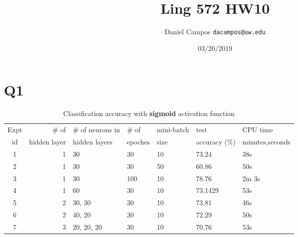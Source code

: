 \documentclass[11pt]{article}
\begin{document}
\title{Ling 572 HW10}
\author{Daniel Campos  \tt {dacampos@uw.edu}}
\date{03/20/2019}
\maketitle 
\section{Q1}         
\begin{table}[h]
\centering
\caption{Classification accuracy with {\bf sigmoid} activation function}
\label{table1}
  \begin{tabular}{|c|r|l|l|l|l|l|} \hline
    Expt & \# of          & \# of neurons in & \# of    & mini-batch & test  & CPU time   \\  
    id   &  hidden layer  & hidden layers    & epoches & size       & accuracy (\%) & minutes,seconds \\ \hline
    1   &  1              &  30              &  30     &  10       &  73.24   & 38s \\ \hline
    2   &  1              &  30              &  30     &  50       &  60.86   & 50s \\ \hline
    3   &  1              &  30              &  100    &  10       &  78.76   & 2m 3s  \\ \hline
    4   &  1              &  60              &  30     &  10       &  73.1429   & 53s \\ \hline
    5   &  2              &  30, 30          &  30     &  10       &  73.81  & 46s \\ \hline
    6   &  2              &  40, 20          &  30     &  10       &  72.29   & 50s\\ \hline
    7   &  3              &  20, 20, 20      &  30     &  10       &  70.76  & 53s \\ \hline
  \end{tabular}
\end{table}
\end{document}
